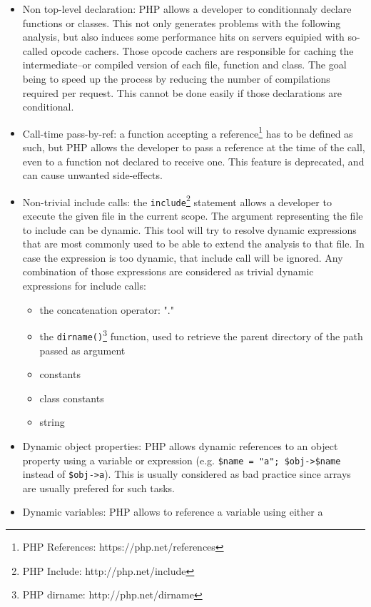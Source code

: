 \documentclass[a4paper]{article}
\begin{document}
\begin{itemize}
  \item Non top-level declaration: PHP allows a developer to conditionnaly
    declare functions or classes. This not only generates problems with the
    following analysis, but also induces some performance hits on servers equipied
    with so-called opcode cachers. Those opcode cachers are responsible for caching
    the intermediate--or compiled version of each file, function and class. The
    goal being to speed up the process by reducing the number of compilations
    required per request. This cannot be done easily if those declarations are
    conditional.
  \item Call-time pass-by-ref: a function accepting a reference\footnote{PHP
    References: https://php.net/references} has to be defined as such, but PHP
    allows the developer to pass a reference at the time of the call, even to a
    function not declared to receive one. This feature is deprecated, and can cause
    unwanted side-effects.
  \item Non-trivial include calls: the \verb=include=\footnote{PHP Include:
    http://php.net/include} statement allows a developer to execute the given file
    in the current scope. The argument representing the file to include can be
    dynamic. This tool will try to resolve dynamic expressions that are most
    commonly used to be able to extend the analysis to that file. In case the
    expression is too dynamic, that include call will be ignored. Any
    combination of those expressions are considered as trivial dynamic expressions
    for include calls:
    \begin{itemize}
      \item the concatenation operator: "."
      \item the \verb=dirname()=\footnote{PHP dirname: http://php.net/dirname} function,
          used to retrieve the parent directory of the path passed as argument
      \item constants
      \item class constants
      \item string
    \end{itemize}
  \item Dynamic object properties: PHP allows dynamic references to an object property
    using a variable or expression (e.g. \verb.$name = "a"; $obj->$name. instead of
    \verb.$obj->a.). This is usually considered as bad practice since arrays are
    usually prefered for such tasks.
  \item Dynamic variables: PHP allows to reference a variable using either a

\end{itemize}
\end{document}
